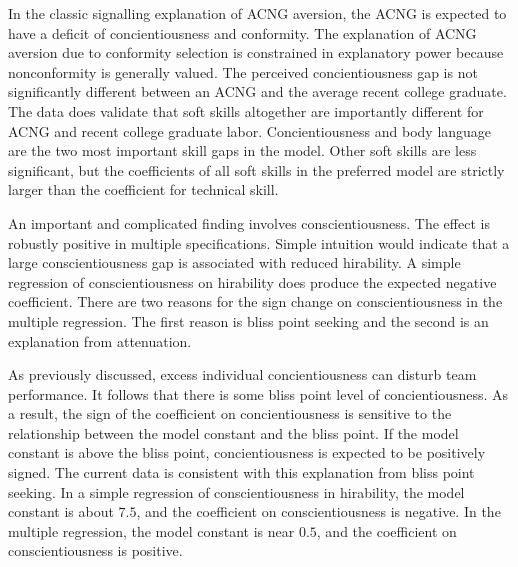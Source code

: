 \documentclass[review]{elsarticle}
\begin{document}
In the classic signalling explanation of ACNG aversion, the ACNG is expected to have a deficit of concientiousness and conformity.
The explanation of ACNG aversion due to conformity selection is constrained in explanatory power because nonconformity is generally valued.
The perceived concientiousness gap is not significantly different between an ACNG and the average recent college graduate.
The data does validate that soft skills altogether are importantly different for ACNG and recent college graduate labor.
Concientiousness and body language are the two most important skill gaps in the model.
Other soft skills are less significant, but the coefficients of all soft skills in the preferred model are strictly larger than the coefficient for technical skill.

An important and complicated finding involves conscientiousness.
The effect is robustly positive in multiple specifications.
Simple intuition would indicate that a large conscientiousness gap is associated with reduced hirability.
A simple regression of conscientiousness on hirability does produce the expected negative coefficient.
There are two reasons for the sign change on conscientiousness in the multiple regression.
The first reason is bliss point seeking and the second is an explanation from attenuation.

As previously discussed, excess individual concientiousness can disturb team performance\cite{curcseu2019personality}.
It follows that there is some bliss point level of concientiousness.
As a result, the sign of the coefficient on concientiousness is sensitive to the relationship between the model constant and the bliss point.
If the model constant is above the bliss point, concientiousness is expected to be positively signed.
The current data is consistent with this explanation from bliss point seeking.
In a simple regression of conscientiousness in hirability, the model constant is about $7.5$, and the coefficient on conscientiousness is negative.
In the multiple regression, the model constant is near $0.5$, and the coefficient on conscientiousness is positive.

\end{document}
